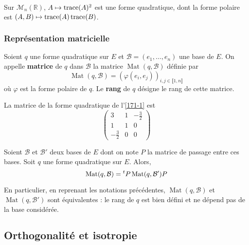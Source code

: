 
  \begin{example}
    Sur $\mathcal{M}_n(\mathbb{R})$, $A \mapsto \operatorname{trace}(A)^2$ est une forme quadratique, dont la forme polaire est $(A, B) \mapsto \operatorname{trace}(A)\operatorname{trace}(B)$.
  \end{example}

  \subsubsection{Représentation matricielle}


  \begin{definition}
    Soient $q$ une forme quadratique sur $E$ et $\mathcal{B} = (e_1, \dots, e_n)$ une base de $E$. On appelle \textbf{matrice} de $q$ dans $\mathcal{B}$ la matrice $\operatorname{Mat}(q, \mathcal{B})$ définie par
    \[ \operatorname{Mat}(q, \mathcal{B}) = (\varphi(e_i, e_j))_{i, j \in \llbracket 1, n \rrbracket} \]
    où $\varphi$ est la forme polaire de $q$. Le \textbf{rang} de $q$ désigne le rang de cette matrice.
  \end{definition}

  \begin{example}
    La matrice de la forme quadratique de l'\cref{171-1} est
    \[
    \begin{pmatrix}
      3 & 1 & -\frac{3}{2} \\
      1 & 1 & 0 \\
      -\frac{3}{2} & 0 & 0
    \end{pmatrix}
    \]
  \end{example}

  \begin{proposition}
    Soient $\mathcal{B}$ et $\mathcal{B}'$ deux bases de $E$ dont on note $P$ la matrice de passage entre ces bases. Soit $q$ une forme quadratique sur $E$. Alors,
    \[ \operatorname{Mat}(q, \mathcal{B}) = \mathstrut ^t P \operatorname{Mat}(q, \mathcal{B}') P \]
  \end{proposition}

  \begin{remark}
    En particulier, en reprenant les notations précédentes, $\operatorname{Mat}(q, \mathcal{B})$ et $\operatorname{Mat}(q, \mathcal{B}')$ sont équivalentes : le rang de $q$ est bien défini et ne dépend pas de la base considérée.
  \end{remark}

  \subsection{Orthogonalité et isotropie}

